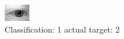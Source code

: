 \begin{figure}[h!]
\begin{center}
\includegraphics[width=0.60\columnwidth]{figures/ID389_class_1_target_2.png}
\end{center}
\caption{ Classification: 1 actual target: 2}
\label{fig:ID389_class_1_target_2}
\end{figure}

